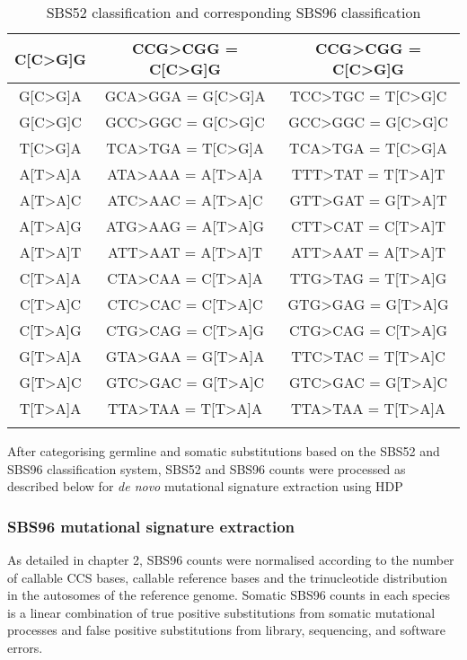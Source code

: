 \begin{longtable}{c|c|c}
\ttfamily C[C>G]G & \ttfamily CCG>CGG = C[C>G]G & \ttfamily CCG>CGG = C[C>G]G \\ \hline
\ttfamily G[C>G]A & \ttfamily GCA>GGA = G[C>G]A & \ttfamily TCC>TGC = T[C>G]C \\ \hline
\ttfamily G[C>G]C & \ttfamily GCC>GGC = G[C>G]C & \ttfamily GCC>GGC = G[C>G]C \\ \hline
\ttfamily T[C>G]A & \ttfamily TCA>TGA = T[C>G]A & \ttfamily TCA>TGA = T[C>G]A \\ \hline
\ttfamily A[T>A]A & \ttfamily ATA>AAA = A[T>A]A & \ttfamily TTT>TAT = T[T>A]T \\ \hline
\ttfamily A[T>A]C & \ttfamily ATC>AAC = A[T>A]C & \ttfamily GTT>GAT = G[T>A]T \\ \hline
\ttfamily A[T>A]G & \ttfamily ATG>AAG = A[T>A]G & \ttfamily CTT>CAT = C[T>A]T \\ \hline
\ttfamily A[T>A]T & \ttfamily ATT>AAT = A[T>A]T & \ttfamily ATT>AAT = A[T>A]T \\ \hline
\ttfamily C[T>A]A & \ttfamily CTA>CAA = C[T>A]A & \ttfamily TTG>TAG = T[T>A]G \\ \hline
\ttfamily C[T>A]C & \ttfamily CTC>CAC = C[T>A]C & \ttfamily GTG>GAG = G[T>A]G \\ \hline
\ttfamily C[T>A]G & \ttfamily CTG>CAG = C[T>A]G & \ttfamily CTG>CAG = C[T>A]G \\ \hline
\ttfamily G[T>A]A & \ttfamily GTA>GAA = G[T>A]A & \ttfamily TTC>TAC = T[T>A]C \\ \hline
\ttfamily G[T>A]C & \ttfamily GTC>GAC = G[T>A]C & \ttfamily GTC>GAC = G[T>A]C \\ \hline
\ttfamily T[T>A]A & \ttfamily TTA>TAA = T[T>A]A & \ttfamily TTA>TAA = T[T>A]A \\ \hline
\caption{SBS52 classification and corresponding SBS96 classification}
\end{longtable}
\endgroup

After categorising germline and somatic substitutions based on the SBS52 and SBS96 classification system, SBS52 and SBS96 counts were processed as described below for \textit{de novo} mutational signature extraction using HDP \cite{}

\subsubsection{SBS96 mutational signature extraction}

As detailed in chapter 2, SBS96 counts were normalised according to the number of callable CCS bases, callable reference bases and the trinucleotide distribution in the autosomes of the reference genome. Somatic SBS96 counts in each species is a linear combination of true positive substitutions from somatic mutational processes and false positive substitutions from library, sequencing, and software errors. 

